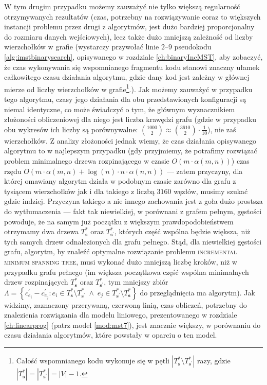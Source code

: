 W tym drugim przypadku możemy zauważyć nie tylko większą regularność otrzymywanych rezultatów (czas, potrzebny na rozwiązywanie coraz to większych instancji problemu przez drugi z algorytmów, jest dużo bardziej proporcjonalny do rozmiaru danych wejściowych), lecz także dużo mniejszą zależność od liczby wierzchołków w grafie (wystarczy przywołać linie $2$--$9$ pseudokodu \ref{alg:imstbinarysearch}, opisywanego w rozdziale \ref{ch:binaryIncMST}, aby zobaczyć, że czas wykonywania się wspomnianego fragmentu kodu stanowi znaczny ułamek całkowitego czasu działania algorytmu, gdzie dany kod jest zależny w głównej mierze od liczby wierzchołków w grafie\footnote{Całość wspomnianego kodu wykonuje się w pętli $\left| T^{\ast}_{\textbf{s}} \setminus T^{\ast}_{\textbf{s}^{\prime}} \right|$ razy, gdzie $\left| T^{\ast}_{\textbf{s}} \right| = \left| T^{\ast}_{\textbf{s}^{\prime}} \right| = \left| V \right| - 1$.}.). Jak możemy zauważyć w przypadku tego algorytmu, czasy jego działania dla obu przedstawionych konfiguracji są niemal identyczne, co może świadczyć o tym, że głównym wyznacznikiem złożoności obliczeniowej dla niego jest liczba krawędzi grafu (gdzie w przypadku obu wykresów ich liczby są porównywalne: $\binom{1000}{2} \approx \binom{3610}{2} \cdot \frac{1}{10}$), nie zaś wierzchołków. Z analizy złożoności jednak wiemy, że czas działania opisywanego algorytmu to w najlepszym przypadku (gdy przyjmiemy, że potrafimy rozwiązać problem minimalnego drzewa rozpinającego w czasie $O \left( m \cdot \alpha \left( m, n \right) \right)$) czas rzędu $O \left( m \cdot \alpha  \left( m, n \right) + \log \left( n \right) \cdot n \cdot \alpha \left( n, n \right) \right)$ --- zatem przyczyny, dla której omawiany algorytm działa w podobnym czasie zarówno dla grafu z tysiącem wierzchołków jak i dla takiego z liczbą $3160$ węzłów, musimy szukać gdzie indziej. Przyczyna takiego a nie innego zachowania jest z goła dużo prostsza do wytłumaczenia --- fakt tak niewielkiej, w porównani z grafem pełnym, gęstości powoduje, że na samym już początku z większym prawdopodobieństwem otrzymamy dwa drzewa $T^{\ast}_{\textbf{s}}$ oraz $T^{\ast}_{\textbf{s}^{\prime}}$, których część wspólna będzie większa, niż tych samych drzew odnalezionych dla grafu pełnego. Stąd, dla niewielkiej gęstości grafu, algorytm, by znaleźć optymalne rozwiązanie problemu \textsc{incremental minimum spanning tree}, musi wykonać dużo mniejszą liczbę kroków, niż w przypadku grafu pełnego (im większa początkowa część wspólna minimalnych drzew rozpinających $T^{\ast}_{\textbf{s}}$ oraz $T^{\ast}_{\textbf{s}^{\prime}}$, tym mniejszy zbiór $\Lambda = \left\{ c^{\prime}_{e_{i}} - c^{\prime}_{e_{j}} : e_{i} \in T^{\ast}_{\textbf{s}} \setminus T^{\ast}_{\textbf{s}^{\prime}} \; \wedge \; e_{j} \in T^{\ast}_{\textbf{s}^{\prime}} \setminus T^{\ast}_{\textbf{s}} \right\}$ do przeglądnięcia ma algorytm). Jak widzimy, zaznaczony przerywaną, czerwoną linią, czas obliczeń, potrzebny do znalezienia rozwiązania dla modelu liniowego, prezentowanego w rozdziale \ref{ch:linearprog} (patrz model \ref{mod:mst7}), jest znacznie większy, w porównaniu do czasu działania algorytmów, które powstały w oparciu o ten model.

